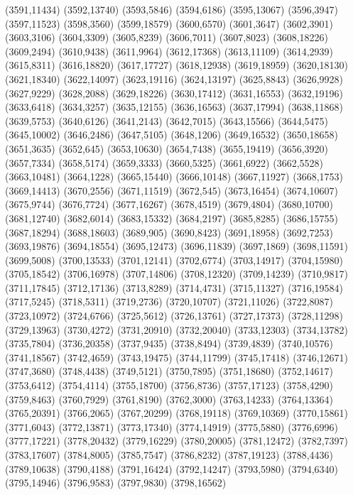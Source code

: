 (3591,11434)
(3592,13740)
(3593,5846)
(3594,6186)
(3595,13067)
(3596,3947)
(3597,11523)
(3598,3560)
(3599,18579)
(3600,6570)
(3601,3647)
(3602,3901)
(3603,3106)
(3604,3309)
(3605,8239)
(3606,7011)
(3607,8023)
(3608,18226)
(3609,2494)
(3610,9438)
(3611,9964)
(3612,17368)
(3613,11109)
(3614,2939)
(3615,8311)
(3616,18820)
(3617,17727)
(3618,12938)
(3619,18959)
(3620,18130)
(3621,18340)
(3622,14097)
(3623,19116)
(3624,13197)
(3625,8843)
(3626,9928)
(3627,9229)
(3628,2088)
(3629,18226)
(3630,17412)
(3631,16553)
(3632,19196)
(3633,6418)
(3634,3257)
(3635,12155)
(3636,16563)
(3637,17994)
(3638,11868)
(3639,5753)
(3640,6126)
(3641,2143)
(3642,7015)
(3643,15566)
(3644,5475)
(3645,10002)
(3646,2486)
(3647,5105)
(3648,1206)
(3649,16532)
(3650,18658)
(3651,3635)
(3652,645)
(3653,10630)
(3654,7438)
(3655,19419)
(3656,3920)
(3657,7334)
(3658,5174)
(3659,3333)
(3660,5325)
(3661,6922)
(3662,5528)
(3663,10481)
(3664,1228)
(3665,15440)
(3666,10148)
(3667,11927)
(3668,1753)
(3669,14413)
(3670,2556)
(3671,11519)
(3672,545)
(3673,16454)
(3674,10607)
(3675,9744)
(3676,7724)
(3677,16267)
(3678,4519)
(3679,4804)
(3680,10700)
(3681,12740)
(3682,6014)
(3683,15332)
(3684,2197)
(3685,8285)
(3686,15755)
(3687,18294)
(3688,18603)
(3689,905)
(3690,8423)
(3691,18958)
(3692,7253)
(3693,19876)
(3694,18554)
(3695,12473)
(3696,11839)
(3697,1869)
(3698,11591)
(3699,5008)
(3700,13533)
(3701,12141)
(3702,6774)
(3703,14917)
(3704,15980)
(3705,18542)
(3706,16978)
(3707,14806)
(3708,12320)
(3709,14239)
(3710,9817)
(3711,17845)
(3712,17136)
(3713,8289)
(3714,4731)
(3715,11327)
(3716,19584)
(3717,5245)
(3718,5311)
(3719,2736)
(3720,10707)
(3721,11026)
(3722,8087)
(3723,10972)
(3724,6766)
(3725,5612)
(3726,13761)
(3727,17373)
(3728,11298)
(3729,13963)
(3730,4272)
(3731,20910)
(3732,20040)
(3733,12303)
(3734,13782)
(3735,7804)
(3736,20358)
(3737,9435)
(3738,8494)
(3739,4839)
(3740,10576)
(3741,18567)
(3742,4659)
(3743,19475)
(3744,11799)
(3745,17418)
(3746,12671)
(3747,3680)
(3748,4438)
(3749,5121)
(3750,7895)
(3751,18680)
(3752,14617)
(3753,6412)
(3754,4114)
(3755,18700)
(3756,8736)
(3757,17123)
(3758,4290)
(3759,8463)
(3760,7929)
(3761,8190)
(3762,3000)
(3763,14233)
(3764,13364)
(3765,20391)
(3766,2065)
(3767,20299)
(3768,19118)
(3769,10369)
(3770,15861)
(3771,6043)
(3772,13871)
(3773,17340)
(3774,14919)
(3775,5880)
(3776,6996)
(3777,17221)
(3778,20432)
(3779,16229)
(3780,20005)
(3781,12472)
(3782,7397)
(3783,17607)
(3784,8005)
(3785,7547)
(3786,8232)
(3787,19123)
(3788,4436)
(3789,10638)
(3790,4188)
(3791,16424)
(3792,14247)
(3793,5980)
(3794,6340)
(3795,14946)
(3796,9583)
(3797,9830)
(3798,16562)
